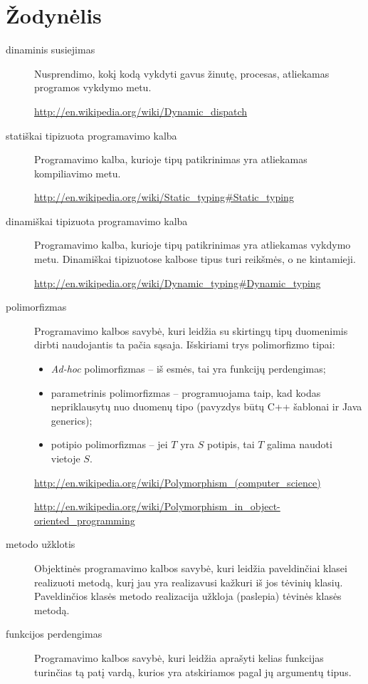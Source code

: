\chapter{Žodynėlis}

\begin{description}

  \item[dinaminis susiejimas ]
    Nusprendimo, kokį kodą vykdyti gavus žinutę, procesas,
    atliekamas programos vykdymo metu.

    \url{http://en.wikipedia.org/wiki/Dynamic_dispatch}

  \item[statiškai tipizuota programavimo kalba ] 
    Programavimo kalba, kurioje tipų patikrinimas yra atliekamas kompiliavimo
    metu.

    \url{http://en.wikipedia.org/wiki/Static_typing#Static_typing}

  \item[dinamiškai tipizuota programavimo kalba ]
    Programavimo kalba, kurioje tipų patikrinimas yra atliekamas vykdymo
    metu. Dinamiškai tipizuotose kalbose tipus turi reikšmės, o ne
    kintamieji.

    \url{http://en.wikipedia.org/wiki/Dynamic_typing#Dynamic_typing}

  \item[polimorfizmas ]
    Programavimo kalbos savybė, kuri leidžia su skirtingų tipų duomenimis
    dirbti naudojantis ta pačia sąsaja. Išskiriami trys polimorfizmo tipai:
    \begin{itemize}
      \item \emph{Ad-hoc} polimorfizmas  –
        iš esmės, tai yra funkcijų perdengimas;
      \item parametrinis polimorfizmas  –
        programuojama taip, kad kodas nepriklausytų nuo duomenų tipo
        (pavyzdys būtų C++ šablonai ir Java generics);
      \item potipio polimorfizmas  – 
        jei $T$ yra $S$ potipis, tai $T$ galima naudoti vietoje $S$.
    \end{itemize}

    \url{http://en.wikipedia.org/wiki/Polymorphism_(computer_science)}

    \url{http://en.wikipedia.org/wiki/Polymorphism_in_object-oriented_programming}

  \item[metodo užklotis ]
    Objektinės programavimo kalbos savybė, kuri leidžia paveldinčiai klasei
    realizuoti metodą, kurį jau yra realizavusi kažkuri iš jos tėvinių
    klasių. Paveldinčios klasės metodo realizacija užkloja (paslepia)
    tėvinės klasės metodą.

  \item[funkcijos perdengimas ]
    Programavimo kalbos savybė, kuri leidžia aprašyti kelias funkcijas
    turinčias tą patį vardą, kurios yra atskiriamos pagal jų argumentų
    tipus.

\end{description}
